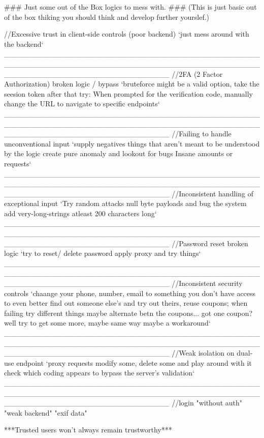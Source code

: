 ### Just some out of the Box logics to mess with. ###
(This is just basic out of the box thiking you should think and develop further yourslef.)

//Excessive trust in client-side controls (poor backend)
`just mess around with the backend`
_______________________________________________________________________________________________________________________________
//2FA (2 Factor Authorization) broken logic / bypass
 `bruteforce might be a valid option,
  take the seesion token after that
  try: When prompted for the verification code, manually change the URL 
  to navigate to specific endpoints`
_______________________________________________________________________________________________________________________________
//Failing to handle unconventional input
`supply negatives 
things that aren't meant to be understood by the logic
create pure anomaly and lookout for bugs
Insane amounts or requests`
_______________________________________________________________________________________________________________________________
//Inconsistent handling of exceptional input
`Try random attacks null byte payloads and bug the system
add very-long-strings atleast 200 characters long`
_______________________________________________________________________________________________________________________________
//Password reset broken logic
`try to reset/ delete password apply proxy and try things`
_______________________________________________________________________________________________________________________________
//Inconsistent security controls
`chaange your phone, number, email to something you don't have access to 
even better find out someone else's and try out theirs,
reuse coupons; when failing try different things maybe alternate betn the coupons...
got one coupon? well try to get some more, maybe same way maybe a workaround`
_______________________________________________________________________________________________________________________________
//Weak isolation on dual-use endpoint
`proxy requests modify some, delete some and play around with it
check which coding appears to bypass the server's validation`
_______________________________________________________________________________________________________________________________
//login
"without auth"
"weak backend"
"exif data"

           ***Trusted users won't always remain trustworthy***
